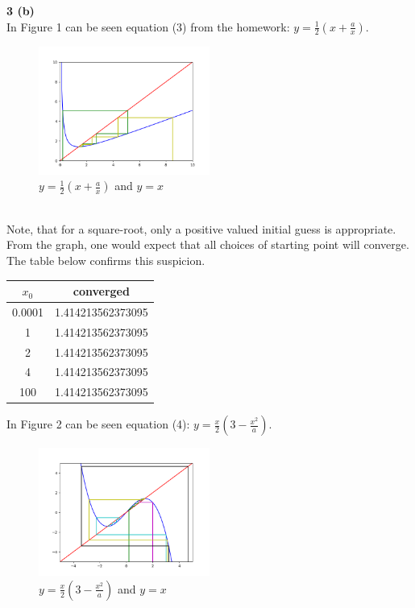 \documentclass[12pt]{article}
\newcommand{\problem}[1]{\hspace{-4 ex} \large \textbf{#1}\\}
\begin{document}
\problem{3 (b)}
	In Figure 1 can be seen equation (3) from the homework: $y=\frac{1}{2}(x+\frac{a}{x})$.
	\begin{figure}[h]
		\caption{$y=\frac{1}{2}(x+\frac{a}{x})$ and $y=x$}
		\centering
		\includegraphics[width=0.5\textwidth]{hw2_figure_1}
	\end{figure}\\
	Note, that for a square-root, only a positive valued initial guess is appropriate. From the graph, one would expect that all choices of starting point will converge. The table below confirms this suspicion. 
	\begin{center}
		\begin{tabular}{|c|c|}
			\hline
			$x_0$&converged\\ \hline
			0.0001&1.414213562373095\\ \hline
			1&1.414213562373095\\ \hline
			2&1.414213562373095\\ \hline
			4&1.414213562373095\\ \hline
			100&1.414213562373095\\ \hline
		\end{tabular}
	\end{center}
	
	In Figure 2 can be seen equation (4): $y=\frac{x}{2}(3-\frac{x^2}{a})$.
	\begin{figure}[h]
		\caption{$y=\frac{x}{2}(3-\frac{x^2}{a})$ and $y=x$}
		\centering
		\includegraphics[width=0.5\textwidth]{hw2_figure_2}
	\end{figure}
	
\end{document}
